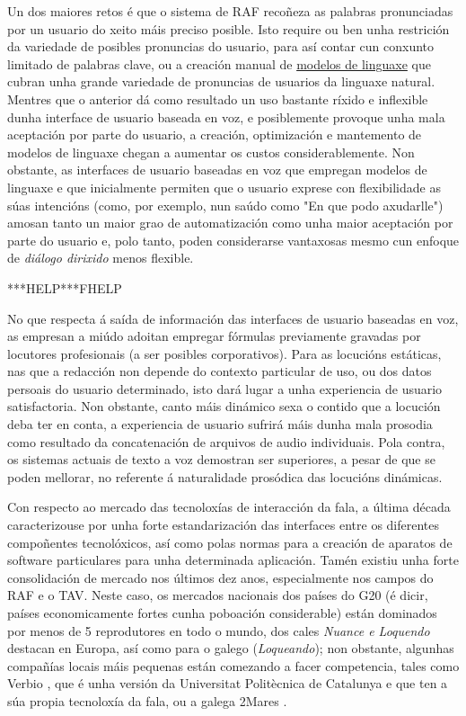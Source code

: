 \begin{multicols}{2}
\begin{itemize}
    \end{itemize}
 
  Un dos maiores retos é que o sistema de RAF recoñeza as palabras pronunciadas por un usuario do xeito máis preciso posible. Isto require ou ben unha restrición da variedade de posibles pronuncias do usuario, para así contar cun conxunto limitado de palabras clave, ou a creación manual de \uline{modelos de linguaxe} que cubran unha grande variedade de pronuncias de usuarios da linguaxe natural. Mentres que o anterior dá como resultado un uso bastante ríxido e inflexible dunha interface de usuario baseada en voz, e posiblemente provoque unha mala aceptación por parte do usuario, a creación, optimización e mantemento de modelos de linguaxe chegan a aumentar os custos considerablemente. Non obstante, as interfaces de usuario baseadas en voz que empregan modelos de linguaxe e que inicialmente permiten que o usuario exprese con flexibilidade as súas intencións (como, por exemplo, nun saúdo como "En que podo axudarlle") amosan tanto un maior grao de automatización como unha maior aceptación por parte do usuario e, polo tanto, poden considerarse vantaxosas mesmo cun enfoque de \textit{diálogo dirixido }  menos flexible.

***HELP***FHELP

No que respecta á saída de información das interfaces de usuario baseadas en voz, as empresan a miúdo adoitan empregar fórmulas previamente gravadas por locutores profesionais (a ser posibles corporativos). Para as locucións estáticas, nas que a redacción non depende do contexto particular de uso, ou dos datos persoais do usuario determinado, isto dará lugar a unha experiencia de usuario satisfactoria. Non obstante, canto máis dinámico sexa o contido que a locución deba ter en conta, a experiencia de usuario sufrirá máis dunha mala prosodia como resultado da concatenación de arquivos de audio individuais. Pola contra, os sistemas actuais de texto a voz demostran ser superiores, a pesar de que se poden mellorar, no referente á naturalidade prosódica das locucións dinámicas. 

Con respecto ao mercado das tecnoloxías de interacción da fala, a última década caracterizouse por unha forte estandarización das interfaces entre os diferentes compoñentes tecnolóxicos, así como polas normas para a creación de aparatos de software particulares para unha determinada aplicación. Tamén existiu unha forte consolidación de mercado nos últimos dez anos, especialmente nos campos do RAF e o TAV. Neste caso, os mercados nacionais dos países do G20 (é dicir, países economicamente fortes cunha poboación considerable) están dominados por menos de 5 reprodutores en todo o mundo, dos cales \textit{Nuance e Loquendo} destacan en Europa, así como para o galego (\textit{Loqueando}); non obstante, algunhas compañías locais máis pequenas están comezando a facer competencia, tales como Verbio \cite{GAL-Nota25} , que é unha versión da Universitat Politècnica de Catalunya e que ten a súa propia tecnoloxía da fala, ou a galega 2Mares \cite{GAL-Nota26}.


\end{multicols}
